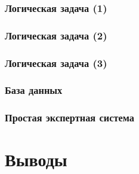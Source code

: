 \subsubsection{Логическая задача (1)}


\subsubsection{Логическая задача (2)}


\subsubsection{Логическая задача (3)}


\subsubsection{База данных}


\subsubsection{Простая экспертная система}


\section{Выводы}

\newpage





